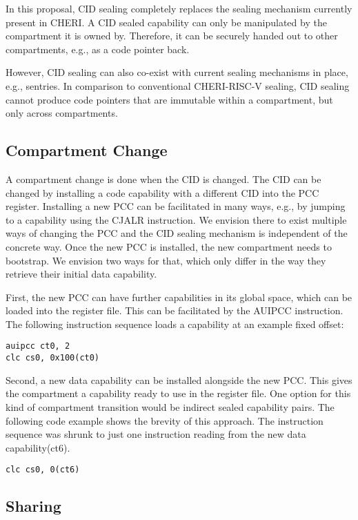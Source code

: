 In this proposal, CID sealing completely replaces the sealing mechanism currently present in CHERI.
A CID sealed capability can only be manipulated by the compartment it is owned by.
Therefore, it can be securely handed out to other compartments, e.g., as a code pointer back.

However, CID sealing can also co-exist with current sealing mechanisms in place, e.g., sentries.
In comparison to conventional CHERI-RISC-V sealing, CID sealing cannot produce code pointers that are immutable within a compartment, but only across compartments.

\subsection{Compartment Change}
\label{subsec:comp_change}

A compartment change is done when the CID is changed.
The CID can be changed by installing a code capability with a different CID into the PCC register.
Installing a new PCC can be facilitated in many ways, e.g., by jumping to a capability using the CJALR instruction.
We envision there to exist multiple ways of changing the PCC and the CID sealing mechanism is independent of the concrete way.
Once the new PCC is installed, the new compartment needs to bootstrap.
We envision two ways for that, which only differ in the way they retrieve their initial data capability.

First, the new PCC can have further capabilities in its global space, which can be loaded into the register file.
This can be facilitated by the AUIPCC instruction.
The following instruction sequence loads a capability at an example fixed offset:

\texttt{auipcc ct0, 2}\\
\texttt{clc cs0, 0x100(ct0)}

Second, a new data capability can be installed alongside the new PCC.
This gives the compartment a capability ready to use in the register file.
One option for this kind of compartment transition would be indirect sealed capability pairs.
The following code example shows the brevity of this approach.
The instruction sequence was shrunk to just one instruction reading from the new data capability(ct6).

\texttt{clc cs0, 0(ct6)}

\subsection{Sharing}

